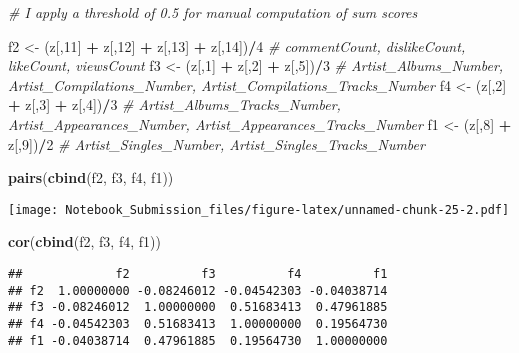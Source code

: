 \documentclass[
]{article}
\newenvironment{Shaded}{\begin{snugshade}}{\end{snugshade}}
\newcommand{\CommentTok}[1]{\textcolor[rgb]{0.56,0.35,0.01}{\textit{#1}}}
\newcommand{\DecValTok}[1]{\textcolor[rgb]{0.00,0.00,0.81}{#1}}
\newcommand{\KeywordTok}[1]{\textcolor[rgb]{0.13,0.29,0.53}{\textbf{#1}}}
\newcommand{\NormalTok}[1]{#1}
\newcommand{\OperatorTok}[1]{\textcolor[rgb]{0.81,0.36,0.00}{\textbf{#1}}}
\newcommand{\StringTok}[1]{\textcolor[rgb]{0.31,0.60,0.02}{#1}}
\begin{document}
\begin{Shaded}
\begin{Highlighting}[]
\CommentTok{# I apply a threshold of 0.5 for manual computation of sum scores}

\NormalTok{f2 <-}\StringTok{ }\NormalTok{(z[,}\DecValTok{11}\NormalTok{] }\OperatorTok{+}\StringTok{ }\NormalTok{z[,}\DecValTok{12}\NormalTok{] }\OperatorTok{+}\StringTok{ }\NormalTok{z[,}\DecValTok{13}\NormalTok{] }\OperatorTok{+}\StringTok{ }\NormalTok{z[,}\DecValTok{14}\NormalTok{])}\OperatorTok{/}\DecValTok{4} \CommentTok{# commentCount, dislikeCount, likeCount, viewsCount}
\NormalTok{f3 <-}\StringTok{ }\NormalTok{(z[,}\DecValTok{1}\NormalTok{] }\OperatorTok{+}\StringTok{ }\NormalTok{z[,}\DecValTok{2}\NormalTok{] }\OperatorTok{+}\StringTok{ }\NormalTok{z[,}\DecValTok{5}\NormalTok{])}\OperatorTok{/}\DecValTok{3} \CommentTok{# Artist_Albums_Number, Artist_Compilations_Number, Artist_Compilations_Tracks_Number}
\NormalTok{f4 <-}\StringTok{ }\NormalTok{(z[,}\DecValTok{2}\NormalTok{] }\OperatorTok{+}\StringTok{ }\NormalTok{z[,}\DecValTok{3}\NormalTok{] }\OperatorTok{+}\StringTok{ }\NormalTok{z[,}\DecValTok{4}\NormalTok{])}\OperatorTok{/}\DecValTok{3} \CommentTok{# Artist_Albums_Tracks_Number, Artist_Appearances_Number, Artist_Appearances_Tracks_Number}
\NormalTok{f1 <-}\StringTok{ }\NormalTok{(z[,}\DecValTok{8}\NormalTok{] }\OperatorTok{+}\StringTok{ }\NormalTok{z[,}\DecValTok{9}\NormalTok{])}\OperatorTok{/}\DecValTok{2} \CommentTok{# Artist_Singles_Number, Artist_Singles_Tracks_Number}

\KeywordTok{pairs}\NormalTok{(}\KeywordTok{cbind}\NormalTok{(f2, f3, f4, f1))}
\end{Highlighting}
\end{Shaded}

\texttt{[image: Notebook\_Submission\_files/figure-latex/unnamed-chunk-25-2.pdf]}

\begin{Shaded}
\begin{Highlighting}[]
\KeywordTok{cor}\NormalTok{(}\KeywordTok{cbind}\NormalTok{(f2, f3, f4, f1))}
\end{Highlighting}
\end{Shaded}

\begin{verbatim}
##             f2          f3          f4          f1
## f2  1.00000000 -0.08246012 -0.04542303 -0.04038714
## f3 -0.08246012  1.00000000  0.51683413  0.47961885
## f4 -0.04542303  0.51683413  1.00000000  0.19564730
## f1 -0.04038714  0.47961885  0.19564730  1.00000000
\end{verbatim}
\end{document}
